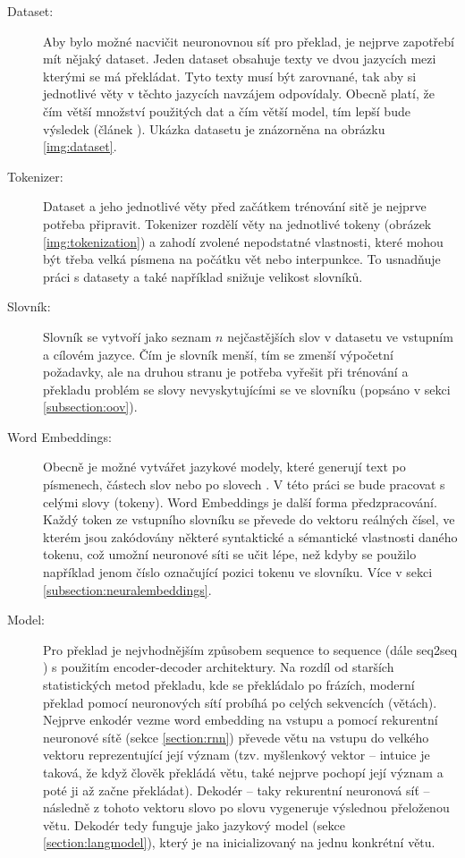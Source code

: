 \begin{description}
  \item[Dataset:] Aby bylo možné nacvičit neuronovnou síť pro překlad, je nejprve zapotřebí mít nějaký dataset. Jeden dataset obsahuje texty ve dvou jazycích mezi kterými se má překládat. Tyto texty musí být zarovnané, tak aby si jednotlivé věty v těchto jazycích navzájem odpovídaly. Obecně platí, že čím větší množství použitých dat a čím větší model, tím lepší bude výsledek (článek \cite{googleLimits}). Ukázka datasetu je znázorněna na obrázku \ref{img:dataset}.

  \item[Tokenizer:] Dataset a jeho jednotlivé věty před začátkem trénování sitě je nejprve potřeba připravit. Tokenizer rozdělí věty na jednotlivé tokeny (obrázek \ref{img:tokenization}) a zahodí zvolené nepodstatné vlastnosti, které mohou být třeba velká písmena na počátku vět nebo interpunkce. To usnadňuje práci s datasety a také například snižuje velikost slovníků.

  \item[Slovník:] Slovník se vytvoří jako seznam $n$ nejčastějších slov v datasetu ve vstupním a cílovém jazyce. Čím je slovník menší, tím se zmenší výpočetní požadavky, ale na druhou stranu je potřeba vyřešit při trénování a překladu problém se slovy nevyskytujícími se ve slovníku (popsáno v sekci \ref{subsection:oov}).

  \item[Word Embeddings:] Obecně je možné vytvářet jazykové modely, které generují text po písmenech, částech slov nebo po slovech \cite{mikolovSubwords}. V této práci se bude pracovat s celými slovy (tokeny). Word Embeddings je další forma předzpracování. Každý token ze vstupního slovníku se převede do vektoru reálných čísel, ve kterém jsou zakódovány některé syntaktické a sémantické vlastnosti daného tokenu, což umožní neuronové síti se učit lépe, než kdyby se použilo například jenom číslo označující pozici tokenu ve slovníku. Více v sekci \ref{subsection:neuralembeddings}.

  \item[Model:] Pro překlad je nejvhodnějším způsobem sequence to sequence (dále seq2seq \cite{seq2seq}) s použitím encoder-decoder architektury. Na rozdíl od starších statistických metod překladu, kde se překládalo po frázích, moderní překlad pomocí neuronových sítí probíhá po celých sekvencích (větách). Nejprve enkodér vezme word embedding na vstupu a pomocí rekurentní neuronové sítě (sekce \ref{section:rnn}) převede větu na vstupu do velkého vektoru reprezentující její význam (tzv. myšlenkový vektor -- intuice je taková, že když člověk překládá větu, také nejprve pochopí její význam a poté ji až začne překládat). Dekodér -- taky rekurentní neuronová síť -- následně z tohoto vektoru slovo po slovu vygeneruje výslednou přeloženou větu. Dekodér tedy funguje jako jazykový model (sekce \ref{section:langmodel}), který je na inicializovaný na jednu konkrétní větu.
\end{description}


